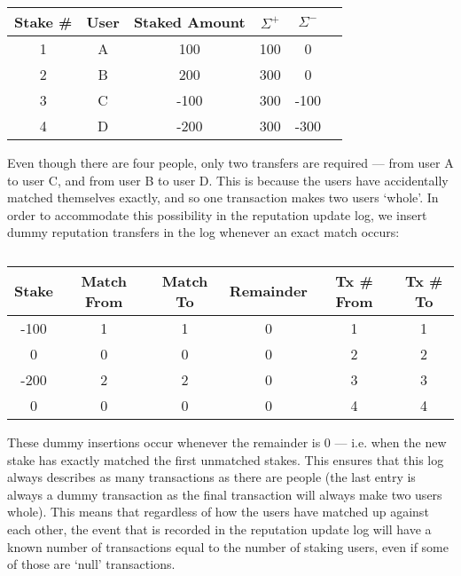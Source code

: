 \begin{table}[ht]
\centering
\caption{}
\begin{tabular}{|c|c|c|c|c|c|}
\hline
Stake \# & User  & Staked Amount & $\Sigma^+$ & $\Sigma^-$ \\ \hline
1 & A & 100           & 100                      & 0                                                                       \\ \hline
2 & B & 200           & 300                      & 0                                                                       \\ \hline
3 & C & -100           & 300                      & -100                                                                       \\ \hline
4 & D & -200          & 300                      & -300                                                                    \\ \hline
\end{tabular}
\end{table}

Even though there are four people, only two transfers are required --- from user A to user C, and from user B to user D. This is because the users have accidentally matched themselves exactly, and so one transaction makes two users `whole'. In order to accommodate this possibility in the reputation update log, we insert dummy reputation transfers in the log whenever an exact match occurs:

\begin{table}[ht]
\centering
\caption{}
\begin{tabular}{|c|c|c|c|c|c|}
\hline
Stake & Match From & Match To & Remainder & Tx \# From & Tx \# To \\ \hline
-100  & 1          & 1        & 0   & 1 & 1     \\ \hline
 0 & 0          & 0        & 0      & 2 & 2   \\ \hline
-200 & 2          & 2        & 0    & 3 & 3    \\ \hline
 0 & 0          & 0        & 0      & 4 & 4   \\ \hline
\end{tabular}
\end{table}

These dummy insertions occur whenever the remainder is 0 --- i.e. when the new stake has exactly matched the first unmatched stakes. This ensures that this log always describes as many transactions as there are people (the last entry is always a dummy transaction as the final transaction will always make two users whole). This means that regardless of how the users have matched up against each other, the event that is recorded in the reputation update log will have a known number of transactions equal to the number of staking users, even if some of those are `null' transactions.

